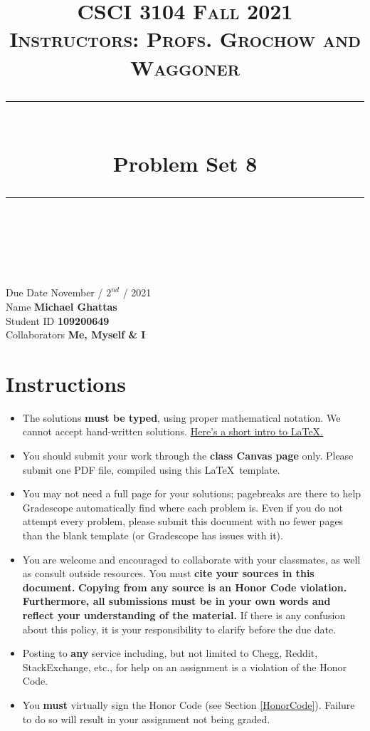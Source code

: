 \documentclass[11pt]{article}
\title{
\normalfont \normalsize 
\textsc{CSCI 3104 Fall 2021 \\ 
Instructors: Profs. Grochow and Waggoner} \\
[10pt] 
\rule{\linewidth}{0.5pt} \\[6pt] 
\huge Problem Set 8\\
\rule{\linewidth}{2pt}  \\[10pt]
}
\date{}
\theoremstyle{definition}
\theoremstyle{definition}
\theoremstyle{definition}
\begin{document}
\maketitle


\noindent
Due Date \dotfill November / $2^{nd}$ / 2021 \\
Name \dotfill \textbf{Michael Ghattas} \\
Student ID \dotfill \textbf{109200649} \\
Collaborators \dotfill \textbf{Me, Myself \& I}

\tableofcontents

\section{Instructions}
 \begin{itemize}
	\item The solutions \textbf{must be typed}, using proper mathematical notation. We cannot accept hand-written solutions. \href{http://ece.uprm.edu/~caceros/latex/introduction.pdf}{Here's a short intro to \LaTeX.}
	\item You should submit your work through the \textbf{class Canvas page} only. Please submit one PDF file, compiled using this \LaTeX \ template.
	\item You may not need a full page for your solutions; pagebreaks are there to help Gradescope automatically find where each problem is. Even if you do not attempt every problem, please submit this document with no fewer pages than the blank template (or Gradescope has issues with it).

	\item You are welcome and encouraged to collaborate with your classmates, as well as consult outside resources. You must \textbf{cite your sources in this document.} \textbf{Copying from any source is an Honor Code violation. Furthermore, all submissions must be in your own words and reflect your understanding of the material.} If there is any confusion about this policy, it is your responsibility to clarify before the due date. 

	\item Posting to \textbf{any} service including, but not limited to Chegg, Reddit, StackExchange, etc., for help on an assignment is a violation of the Honor Code.

	\item You \textbf{must} virtually sign the Honor Code (see Section \ref{HonorCode}). Failure to do so will result in your assignment not being graded.
\end{itemize}
\end{document}
